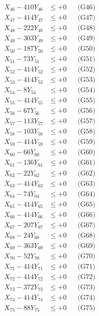 \documentclass[a4paper,10pt]{article}
\begin{document}
{\begin{align}
X_{46} - 410Y_{46} &\leq +0 && \text{(G46)} \\
X_{47} - 414Y_{47} &\leq +0 && \text{(G47)} \\
X_{48} - 222Y_{48} &\leq +0 && \text{(G48)} \\
X_{49} - 303Y_{49} &\leq +0 && \text{(G49)} \\
X_{50} - 187Y_{50} &\leq +0 && \text{(G50)} \\
\allowbreak
X_{51} - 73Y_{51} &\leq +0 && \text{(G51)} \\
X_{52} - 414Y_{52} &\leq +0 && \text{(G52)} \\
X_{53} - 414Y_{53} &\leq +0 && \text{(G53)} \\
X_{54} - 8Y_{54} &\leq +0 && \text{(G54)} \\
X_{55} - 414Y_{55} &\leq +0 && \text{(G55)} \\
X_{56} - 67Y_{56} &\leq +0 && \text{(G56)} \\
X_{57} - 113Y_{57} &\leq +0 && \text{(G57)} \\
X_{58} - 103Y_{58} &\leq +0 && \text{(G58)} \\
X_{59} - 414Y_{59} &\leq +0 && \text{(G59)} \\
X_{60} - 66Y_{60} &\leq +0 && \text{(G60)} \\
\allowbreak
X_{61} - 136Y_{61} &\leq +0 && \text{(G61)} \\
X_{62} - 22Y_{62} &\leq +0 && \text{(G62)} \\
X_{63} - 414Y_{63} &\leq +0 && \text{(G63)} \\
X_{64} - 74Y_{64} &\leq +0 && \text{(G64)} \\
X_{65} - 414Y_{65} &\leq +0 && \text{(G65)} \\
X_{66} - 414Y_{66} &\leq +0 && \text{(G66)} \\
X_{67} - 207Y_{67} &\leq +0 && \text{(G67)} \\
X_{68} - 24Y_{68} &\leq +0 && \text{(G68)} \\
X_{69} - 363Y_{69} &\leq +0 && \text{(G69)} \\
X_{70} - 52Y_{70} &\leq +0 && \text{(G70)} \\
\allowbreak
X_{71} - 414Y_{71} &\leq +0 && \text{(G71)} \\
X_{72} - 414Y_{72} &\leq +0 && \text{(G72)} \\
X_{73} - 372Y_{73} &\leq +0 && \text{(G73)} \\
X_{74} - 414Y_{74} &\leq +0 && \text{(G74)} \\
X_{75} - 88Y_{75} &\leq +0 && \text{(G75)} \\

\end{align}}
\end{document}

